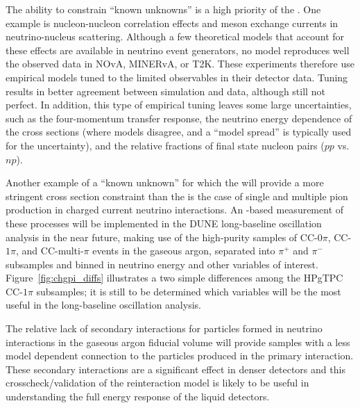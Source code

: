 \begin{itemize}
{The ability to constrain ``known unknowns'' is a high priority of the . One example is nucleon-nucleon correlation effects and meson exchange currents in neutrino-nucleus scattering.  Although a few theoretical models that account for these effects are available in neutrino event generators, no model reproduces well the observed data in NOvA, MINERvA, or T2K.  These experiments therefore use empirical models tuned to the limited observables in their detector data.  Tuning results in better agreement between simulation and data, although still not perfect. In addition, this type of empirical tuning leaves some large uncertainties, such as the four-momentum transfer response, the neutrino energy dependence of the cross sections (where models disagree, and a ``model spread'' is typically used for the uncertainty), and the relative fractions of final state nucleon pairs ($pp$ vs. $np$). 



Another example of a ``known unknown'' for which the  will provide a more stringent cross section constraint than the  is the case of single and multiple pion production in charged current neutrino interactions. An -based measurement of these processes will be implemented in the DUNE long-baseline oscillation analysis in the near future, making use of the high-purity samples of CC-$0\pi$, CC-$1\pi$, and CC-multi-$\pi$ events in the gaseous argon, separated into $\pi^+$ and $\pi^-$ subsamples and binned in neutrino energy and other variables of interest. Figure~\ref{fig:chgpi_diffs} illustrates a two simple differences among the HPgTPC CC-$1\pi$ subsamples; it is still to be determined which variables will be the most useful in the long-baseline oscillation analysis.

The relative lack of secondary interactions for particles formed in neutrino interactions in the gaseous argon fiducial volume will provide samples with a less model dependent connection to the particles produced in the primary interaction.  These secondary interactions are a significant effect in denser detectors \cite{Friedland:2018vry} and this crosscheck/validation of the reinteraction model is likely to be useful in understanding the full energy response of the liquid detectors.   


}
\end{itemize}
